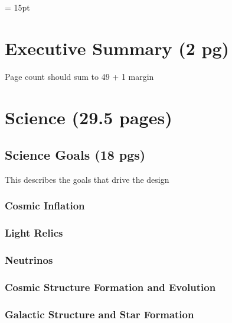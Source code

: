 \documentclass[12pt]{article}
\begin{document}


\setlength{\baselineskip}{0.96\baselineskip} %
\setlength{\parskip}{1.\parskip}

\parindent = 15pt


\setcounter{page}{0}
\setcounter{figure}{0}

\newpage

%

\section{Executive Summary (2 pg)} 


Page count should sum to 49 + 1 margin

\section{Science (29.5 pages)}


\subsection{Science Goals (18 pgs) } 

This describes the goals that drive the design

\subsubsection{Cosmic Inflation}

\subsubsection{Light Relics} 

\subsubsection{Neutrinos}

\subsubsection{Cosmic Structure Formation and Evolution}

\subsubsection{Galactic Structure and Star Formation}
\end{document}
